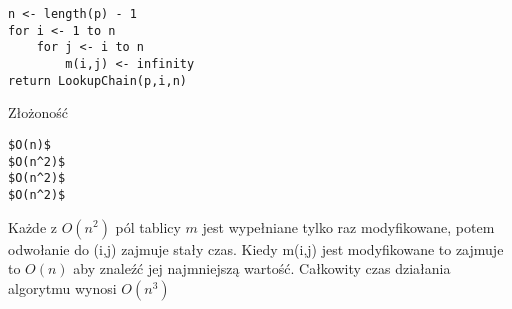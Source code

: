 \begin{lstlisting}[caption={Algorytm MemorizedMatrixChain(p)}]
n <- length(p) - 1
for i <- 1 to n
	for j <- i to n
		m(i,j) <- infinity
return LookupChain(p,i,n)
\end{lstlisting}

Złożoność 
\begin{lstlisting}
$O(n)$
$O(n^2)$
$O(n^2)$
$O(n^2)$
\end{lstlisting}

Każde z $O(n^2)$ pól tablicy $m$ jest wypełniane tylko raz modyfikowane, potem odwołanie do (i,j) zajmuje stały czas.
Kiedy m(i,j) jest modyfikowane to zajmuje to $O(n)$ aby znaleźć jej najmniejszą wartość.
Całkowity czas działania algorytmu wynosi $O(n^3)$

